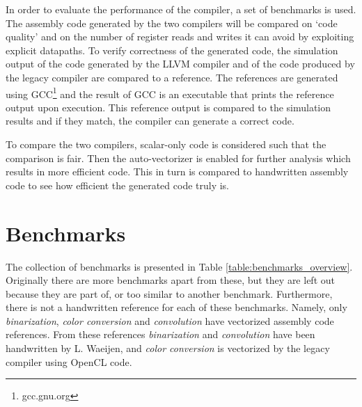 

In order to evaluate the performance of the compiler, a set of benchmarks is used. The assembly code generated by the two compilers will be compared on `code quality' and on the number of register reads and writes it can avoid by exploiting explicit datapaths. To verify correctness of the generated code, the simulation output of the code generated by the LLVM compiler and of the code produced by the legacy compiler are compared to a reference. The references are generated using GCC\footnote{gcc.gnu.org} and the result of GCC is an executable that prints the reference output upon execution. This reference output is compared to the simulation results and if they match, the compiler can generate a correct code.

To compare the two compilers, scalar-only code is considered such that the comparison is fair. Then the auto-vectorizer is enabled for further analysis which results in more efficient code. This in turn is compared to handwritten assembly code to see how efficient the generated code truly is.

\section{Benchmarks}\label{sec:benchies}
The collection of benchmarks is presented in Table \ref{table:benchmarks_overview}. Originally there are more benchmarks apart from these, but they are left out because they are part of, or too similar to another benchmark. Furthermore, there is not a handwritten reference for each of these benchmarks. Namely, only \emph{binarization}, \emph{color conversion} and \emph{convolution} have vectorized assembly code references. From these references \emph{binarization} and \emph{convolution} have been handwritten by L. Waeijen, and \emph{color conversion} is vectorized by the legacy compiler using OpenCL code.

